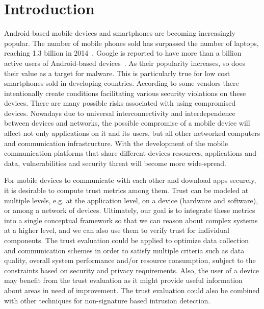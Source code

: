 \section{Introduction}

Android-based mobile devices and smartphones are becoming increasingly popular.  The number of mobile phones
sold has surpassed the number of laptops, reaching 1.3 billion in 
2014~\cite{market}.  Google is 
reported to have more than a billion active users of 
Android-based devices~\cite{android-users}.  
As their popularity increases, so does their value as
a target for malware.  
This is particularly true for low cost smartphones sold in developing countries. According to \cite{zheng2014droidray}
some vendors there intentionally create conditions facilitating various security violations on these devices.
 There are many possible risks associated with using compromised devices.  Nowadays due to universal interconnectivity and 
interdependence between devices and networks, the 
possible compromise of a mobile device will affect not only applications on it and its users, but all other 
networked computers and communication infrastructure.
With the development of the mobile communication platforms that share different devices resources, applications and data, 
vulnerabilities and security threat will become more wide-spread. 

For mobile devices to communicate with each other and download apps securely,
it is desirable to compute trust metrics among them.   Trust can be modeled at 
multiple levels, e.g. at the application level, on a device (hardware and software), or among a network of devices.  Ultimately, our goal
is to integrate these metrics into a single conceptual framework so that we can reason about complex systems at a  
higher level, and we can also use them to verify trust for individual components.
The trust evaluation  could 
be applied to optimize data collection and communication schemes in order to satisfy multiple criteria such as 
data quality, overall
system performance and/or resource consumption, subject to the constraints based on security and privacy requirements.
Also, the user of a device may benefit from the trust evaluation as it might 
provide useful information about areas in need of improvement. The trust evaluation could also be combined with other techniques for
 non-signature based intrusion detection.


